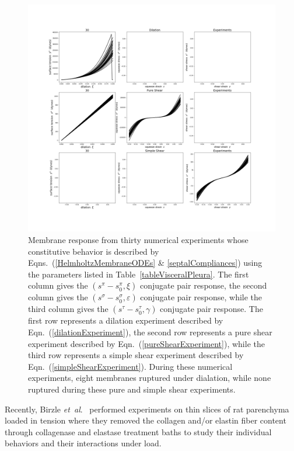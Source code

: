 \begin{figure}
    \mbox{} \hspace{-25mm}
    \includegraphics[width=1.3\textwidth]{figures/septalMembranes.jpg}
    \caption{Membrane response from thirty numerical experiments whose constitutive behavior is described by Eqns.~(\ref{HelmholtzMembraneODEs} \& \ref{septalCompliances}) using the parameters listed in Table~\ref{tableVisceralPleura}. The first column gives the $( s^{\pi} \! - \! s_0^{\pi} , \xi)$ conjugate pair response, the second column gives the $( s^{\sigma} \! - s_0^{\sigma} , \varepsilon)$ conjugate pair response, while the third column gives the $( s^{\tau} \! - \! s_0^{\tau} , \gamma)$ conjugate pair response.  The first row represents a dilation experiment described by Eqn.~(\ref{dilationExperiment}), the second row represents a pure shear experiment described by Eqn.~(\ref{pureShearExperiment}), while the third row represents a simple shear experiment described by Eqn.~(\ref{simpleShearExperiment}).  During these numerical experiments, eight membranes ruptured under dialation, while none ruptured during these pure and simple shear experiments.}
    \label{figStressStrainMembranes}
\end{figure}

Recently, Birzle \textit{et~al}.\ \cite{Birzleetal19} performed experiments on thin slices of rat parenchyma loaded in tension where they removed the collagen and\slash or elastin fiber content through collagenase and elastase treatment baths to study their individual behaviors and their interactions under load.
